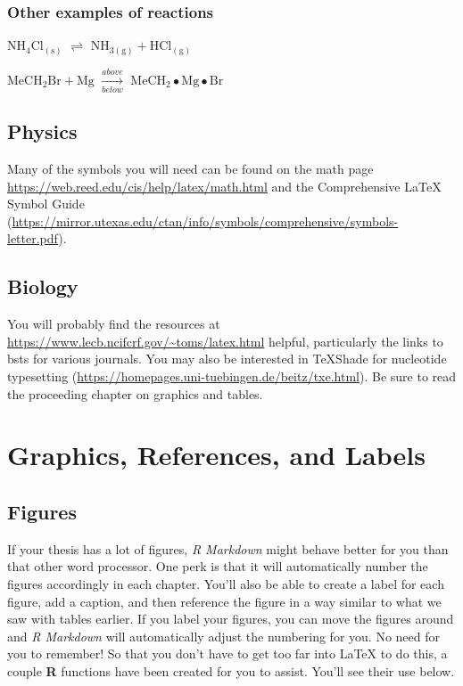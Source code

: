 \documentclass[12pt,twoside]{reedthesis}
\begin{document}
\hypertarget{other-examples-of-reactions}{%
\subsection{Other examples of reactions}\label{other-examples-of-reactions}}

\(\mathrm{NH_4Cl_{(s)}}\) \(\rightleftharpoons\) \(\mathrm{NH_{3(g)}+HCl_{(g)}}\)

\noindent \(\mathrm{MeCH_2Br + Mg}\) \(\xrightarrow[below]{above}\) \(\mathrm{MeCH_2\bullet Mg \bullet Br}\)

\hypertarget{physics}{%
\section{Physics}\label{physics}}

Many of the symbols you will need can be found on the math page \url{https://web.reed.edu/cis/help/latex/math.html} and the Comprehensive LaTeX Symbol Guide (\url{https://mirror.utexas.edu/ctan/info/symbols/comprehensive/symbols-letter.pdf}).

\hypertarget{biology}{%
\section{Biology}\label{biology}}

You will probably find the resources at \url{https://www.lecb.ncifcrf.gov/~toms/latex.html} helpful, particularly the links to bsts for various journals. You may also be interested in TeXShade for nucleotide typesetting (\url{https://homepages.uni-tuebingen.de/beitz/txe.html}). Be sure to read the proceeding chapter on graphics and tables.

\hypertarget{ref-labels}{%
\chapter{Graphics, References, and Labels}\label{ref-labels}}

\hypertarget{figures}{%
\section{Figures}\label{figures}}

If your thesis has a lot of figures, \emph{R Markdown} might behave better for you than that other word processor. One perk is that it will automatically number the figures accordingly in each chapter. You'll also be able to create a label for each figure, add a caption, and then reference the figure in a way similar to what we saw with tables earlier. If you label your figures, you can move the figures around and \emph{R Markdown} will automatically adjust the numbering for you. No need for you to remember! So that you don't have to get too far into LaTeX to do this, a couple \textbf{R} functions have been created for you to assist. You'll see their use below.
\end{document}
